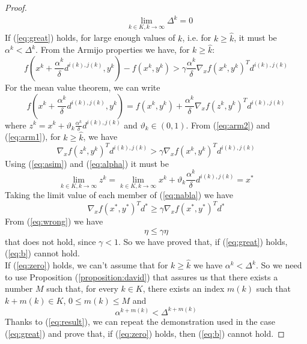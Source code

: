 \begin{proof}
\begin{subequations}
\begin{align}
& \lim_{k \in K, k \rightarrow \infty} \Delta^k = 0 \label{eq:zero}
\end{align}
\end{subequations}
If (\ref{eq:great}) holds, for large enough values of $k$, i.e. for $k \geq \hat{k}$, it must be $\alpha^k < \Delta^k$. From the Armijo properties we have, for $k \geq \hat{k}$:
\begin{equation}\label{eq:arm1}
f(x^k + \frac{\alpha^k}{\delta} d^{i(k),j(k)}, y^k) - f(x^k,y^k) > \gamma \frac{\alpha^k}{\delta} \nabla_x f(x^k, y^k)^T d^{i(k),j(k)}
\end{equation}
For the mean value theorem, we can write
\begin{equation}\label{eq:arm2}
f(x^k + \frac{\alpha^k}{\delta} d^{i(k),j(k)}, y^k) = f(x^k, y^k) + \frac{\alpha^k}{\delta} \nabla_x f(z^k, y^k)^T d^{i(k),j(k)}
\end{equation}
where $z^k = x^k + \vartheta_k \frac{\alpha^k}{\delta} d^{i(k),j(k)}$ and $\vartheta_k \in (0,1)$. From (\ref{eq:arm2}) and (\ref{eq:arm1}), for $k \geq \hat{k}$, we have
\begin{equation}\label{eq:nabla}
\nabla_x f(z^k, y^k)^T d^{i(k),j(k)}  > \gamma \nabla_x f(x^k , y^k)^T d^{i(k),j(k)}
\end{equation}
Using (\ref{eq:asim}) and (\ref{eq:alpha}) it must be
\begin{equation}
\lim_{k \in K, k \rightarrow \infty} z^k = \lim_{k \in K, k \rightarrow \infty} x^k + \vartheta_k \frac{\alpha^k}{\delta} d^{i(k),j(k)} = x^*
\end{equation}
Taking the limit value of each member of (\ref{eq:nabla}) we have
\begin{equation}
\nabla_x f(x^*, y^*)^T d^* \geq \gamma \nabla_x f(x^*, y^*)^T d^*
\end{equation}
From (\ref{eq:wrong}) we have
\begin{equation}
\eta \leq \gamma \eta
\end{equation}
that does not hold, since $\gamma < 1$. So we have proved that, if (\ref{eq:great}) holds, (\ref{eq:b}) cannot hold. \\
If (\ref{eq:zero}) holds, we can't assume that for $k \geq \hat{k}$ we have $\alpha^k < \Delta^k$. So we need to use Proposition (\ref{proposition:david}) that assures us that
there exists a number $M$ such that, for every $k \in K$, there exists an index $m(k)$ such that $k + m(k) \in K$, $0 \leq m(k) \leq M$ and 
\begin{equation}\label{eq:result}
\alpha^{k + m(k)} < \Delta^{k + m(k)}
\end{equation}
Thanks to (\ref{eq:result}), we can repeat the demonstration used in the case (\ref{eq:great}) and prove that, if (\ref{eq:zero}) holds, then (\ref{eq:b}) cannot hold.
\end{proof}